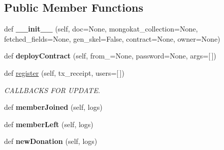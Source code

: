 \subsection*{Public Member Functions}
\begin{DoxyCompactItemize}
\item 
\mbox{\label{classapp_1_1models_1_1organization_1_1_orga_document_ad76ed9fe638a82916c64b6ac5663455c}} 
def {\bfseries \+\_\+\+\_\+init\+\_\+\+\_\+} (self, doc=None, mongokat\+\_\+collection=None, fetched\+\_\+fields=None, gen\+\_\+skel=False, contract=None, owner=None)
\item 
\mbox{\label{classapp_1_1models_1_1organization_1_1_orga_document_a75a0ab0f8714881da65f2aed6d5e41df}} 
def {\bfseries deploy\+Contract} (self, from\+\_\+=None, password=None, args=\mbox{[}$\,$\mbox{]})
\item 
\mbox{\label{classapp_1_1models_1_1organization_1_1_orga_document_abe93544f4a200f1d95c73e78be488f39}} 
def \hyperlink{classapp_1_1models_1_1organization_1_1_orga_document_abe93544f4a200f1d95c73e78be488f39}{register} (self, tx\+\_\+receipt, users=\mbox{[}$\,$\mbox{]})
\begin{DoxyCompactList}\small\item\em C\+A\+L\+L\+B\+A\+C\+KS F\+OR U\+P\+D\+A\+TE. \end{DoxyCompactList}\item 
\mbox{\label{classapp_1_1models_1_1organization_1_1_orga_document_aaf3ed8a58aa55485da704204b7cf667a}} 
def {\bfseries member\+Joined} (self, logs)
\item 
\mbox{\label{classapp_1_1models_1_1organization_1_1_orga_document_a40afd4301a638b0651f332b48a3526a7}} 
def {\bfseries member\+Left} (self, logs)
\item 
\mbox{\label{classapp_1_1models_1_1organization_1_1_orga_document_af5144f279194ae8fb1e078c84cd227b2}} 
def {\bfseries new\+Donation} (self, logs)
\item 
\mbox{\label{classapp_1_1models_1_1organization_1_1_orga_document_a164c80077d2e19cf7ebb08c8abeef536}} 

\end{DoxyCompactItemize}
